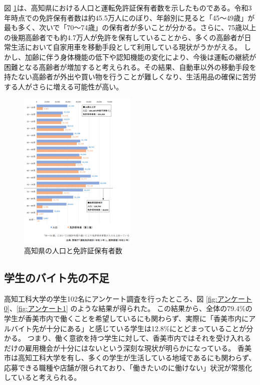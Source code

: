 図 \ref{fig:免許}は、高知県における人口と運転免許証保有者数を示したものである。令和3年時点での免許保有者数は約45.5万人にのぼり、年齢別に見ると「45～49歳」が最も多く、次いで「70～74歳」の保有者が多いことが分かる。さらに、75歳以上の後期高齢者でも約4.7万人が免許を保有していることから、多くの高齢者が日常生活において自家用車を移動手段として利用している現状がうかがえる。
しかし、加齢に伴う身体機能の低下や認知機能の変化により、今後は運転の継続が困難となる高齢者が増加すると考えられる。その結果、自動車以外の移動手段を持たない高齢者が外出や買い物を行うことが難しくなり、生活用品の確保に苦労する人がさらに増える可能性が高い。


\begin{figure}[H]
  \centering
  \includegraphics[width=0.5\textwidth]{免許証.png}
  \caption{高知県の人口と免許証保有者数}
  \label{fig:免許}
\end{figure}


\subsection{学生のバイト先の不足}
高知工科大学の学生102名にアンケート調査を行ったところ、図 \ref{fig:アンケート0}、\ref{fig:アンケート1} のような結果が得られた。 
この結果から、全体の79.4\%の学生が香美市内で働くことを希望しているにも関わらず、実際に「香美市内にアルバイト先が十分にある」と感じている学生は12.8\%にとどまっていることが分かる。 
つまり、働く意欲を持つ学生に対して、香美市内ではそれを受け入れるだけの雇用機会が十分にはないという深刻な現状が明らかになっている。 
香美市は高知工科大学を有し、多くの学生が生活している地域であるにも関わらず、応募できる職種や店舗が限られており、「働きたいのに働けない」状況が常態化していると考えられる。 


